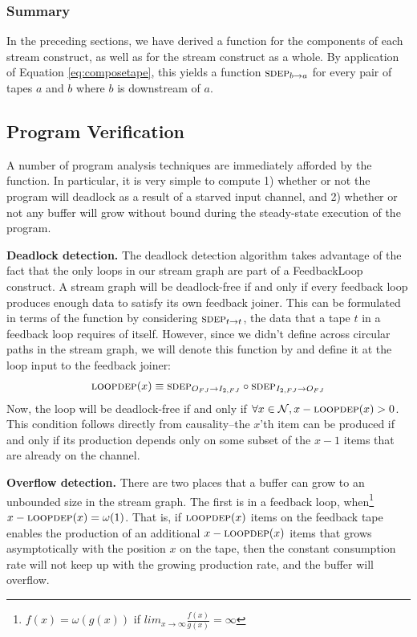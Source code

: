 \subsubsection{Summary}

In the preceding sections, we have derived a \sdep function for the
components of each stream construct, as well as for the stream
construct as a whole.  By application of Equation
\ref{eq:composetape}, this yields a function $\mi{a}{b}$ for every
pair of tapes $a$ and $b$ where $b$ is downstream of $a$.

\subsection{Program Verification}
\label{sec:prog-verif}

A number of program analysis techniques are immediately afforded by
the \sdep function.  In particular, it is very simple to compute 1)
whether or not the program will deadlock as a result of a starved
input channel, and 2) whether or not any buffer will grow without
bound during the steady-state execution of the program.

{\bf Deadlock detection.}  The deadlock detection algorithm takes
advantage of the fact that the only loops in our stream graph are part
of a FeedbackLoop construct.  A stream graph will be deadlock-free if
and only if every feedback loop produces enough data to satisfy its
own feedback joiner.  This can be formulated in terms of the \sdep
function by considering $\mi{t}{t}$, the data that a tape $t$ in a
feedback loop requires of itself.  However, since we didn't define
\sdep across circular paths in the stream graph, we will denote this
function by \loopdep and define it at the loop input to the feedback
joiner:
\begin{align*}
\loopdep(x) \equiv \mi{I_{2,FJ}}{O_{FJ}} \circ \mi{O_{FJ}}{I_{2,FJ}}
\end{align*}
Now, the loop will be deadlock-free if and only if $\forall x \in
\mathcal{N}, x - \textsc{loopdep}(x) > 0$.  This condition follows directly
from causality--the $x$'th item can be produced if and only if its
production depends only on some subset of the $x-1$ items that are
already on the channel.

{\bf Overflow detection.}  There are two places that a buffer can grow
to an unbounded size in the stream graph.  The first is in a feedback
loop, when\footnote{$f(x) = \omega(g(x))$ if $lim_{x \rightarrow
\infty}\frac{f(x)}{g(x)} = \infty$}~$x - \textsc{loopdep}(x) = \omega(1)$.
That is, if $\textsc{loopdep}(x)$ items on the feedback tape enables the
production of an additional $x - \textsc{loopdep}(x)$ items that grows
asymptotically with the position $x$ on the tape, then the constant
consumption rate will not keep up with the growing production rate,
and the buffer will overflow.

